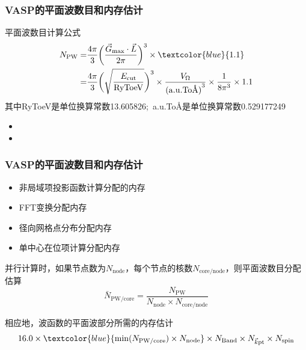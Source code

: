 \frame
{
	\frametitle{\textrm{VASP}的平面波数目和内存估计}
	平面波数目计算公式
	\begin{displaymath}
		\begin{aligned}
			N_{\mathrm{PW}}=&\dfrac{4\pi}3\bigg(\dfrac{\vec G_{\mathrm{max}}\cdot\vec L}{2\pi}\bigg)^3\times\textcolor{blue}{1.1}\\
			=&\dfrac{4\pi}3\bigg(\sqrt{\dfrac{E_{\mathrm{cut}}}{\mathrm{RyToeV}}}\bigg)^3\times\dfrac{V_{\Omega}}{\mathrm{(a.u.To}\mbox{\textrm{\AA)}}^3}\times\dfrac1{8\pi^3}\times1.1
		\end{aligned}
	\end{displaymath}
	{\tiny 其中\textrm{RyToeV}是单位换算常数\textrm{13.605826};~\textrm{a.u.To\AA}是单位换算常数\textrm{0.529177249}}
	\begin{itemize}
		\item {\fontsize{9.2pt}{6.2pt}}
		\item {\fontsize{9.2pt}{6.2pt}}
	\end{itemize}
}

\frame
{
	\frametitle{\textrm{VASP}的平面波数目和内存估计}
	\begin{itemize}
		\item 非局域项投影函数计算分配的内存
		\item \textrm{FFT}变换分配内存
		\item 径向网格点分布分配内存
		\item 单中心在位项计算分配内存
	\end{itemize}
	并行计算时，如果节点数为$N_{\mathrm{node}}$，每个节点的核数$N_{\mathrm{core/node}}$，则平面波数目分配估算
	\begin{displaymath}
		\bar{N}_{\mathrm{PW/core}}=\dfrac{N_{\mathrm{PW}}}{N_{\mathrm{node}}\times N_{\mathrm{core/node}}}
	\end{displaymath}

	相应地，波函数的平面波部分所需的内存估计
				\begin{displaymath}
					16.0\times \textcolor{blue}{\min(N_{\mathrm{PW/core}})\times N_{\mathrm{node}}} \times N_{\mathrm{Band}}\times N_{\vec k\mathrm{pt}}\times N_{\mathrm{spin}}
				\end{displaymath}
}

